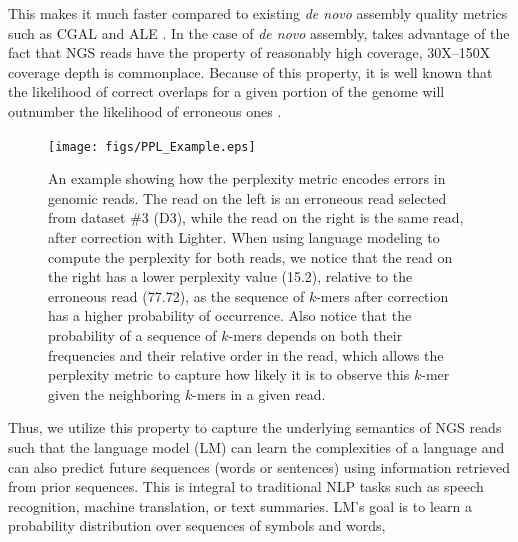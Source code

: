 This makes it much faster compared to existing \textit{de novo} assembly quality metrics such as CGAL \cite{rahman2013cgal} and ALE \cite{clark2013ale}.
In the case of \textit{de novo} assembly, \name takes advantage of the fact that NGS reads have the property of reasonably high coverage, 30X--150X coverage depth is commonplace. 
Because of this property, it is well known that the likelihood of correct overlaps for a given portion of the genome will outnumber the likelihood of erroneous ones \cite{yang2010reptile}.
\begin{figure}
  \texttt{[image: figs/PPL\_Example.eps]}
  \caption{An example showing how the perplexity metric encodes errors in genomic reads. The read on the left is an erroneous read selected from dataset \#3 (D3), while the read on the right is the same read, after correction with Lighter. When using language modeling to compute the perplexity for both reads, we notice that the read on the right has a lower perplexity value (15.2), relative to the erroneous read (77.72), as the sequence of $k$-mers after correction has a higher probability of occurrence. Also notice that the probability of a sequence of $k$-mers depends on both their frequencies and their relative order in the read, which allows the perplexity metric to capture how likely it is to observe this $k$-mer given the neighboring $k$-mers in a given read.}
  \label{fig:PPL_Simple_Example}
\end{figure}
Thus, we utilize this property to capture the underlying semantics of NGS reads such that the language model (LM) can learn the complexities of a language and can also predict future sequences (words or sentences) using information retrieved from prior sequences. This is integral to traditional NLP tasks such as speech recognition, machine translation, or text summaries. LM's goal is to learn a probability distribution over sequences of symbols and words,
